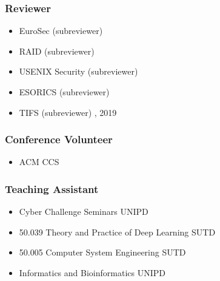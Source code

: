 \documentclass[a4paper, 10pt]{article}
\begin{document}
%
%  

%
\vspace{-1.38em}
\subsubsection*{Reviewer}
\vspace{-0.3em}
\begin{itemize}
  \setlength{\itemsep}{1pt}
  \setlength{\parskip}{0pt}
  \setlength{\parsep}{0pt}
  
\TabPositions{5cm}
\item EuroSec (subreviewer) 
\item RAID (subreviewer) 
\item USENIX Security (subreviewer)
\item ESORICS (subreviewer) 
\item TIFS (subreviewer) , 2019
\end{itemize}

\subsubsection*{Conference Volunteer}
\vspace{-0.3em}
\begin{itemize}
  \setlength{\itemsep}{1pt}
  \setlength{\parskip}{0pt}
  \setlength{\parsep}{0pt}
  
\TabPositions{5cm}
\item ACM CCS 				
\end{itemize}


\subsubsection*{Teaching Assistant}
\vspace{-0.3em}
\begin{itemize}
  \setlength{\itemsep}{1pt}
  \setlength{\parskip}{0pt}
  \setlength{\parsep}{0pt}
  
\TabPositions{9cm, 10.5cm}
\item Cyber Challenge Seminars \tab UNIPD 
\item 50.039 Theory and Practice of Deep Learning \tab SUTD 
\item 50.005 Computer System Engineering \tab SUTD 
\item Informatics and Bioinformatics \tab UNIPD 
\end{itemize}
\end{document}
